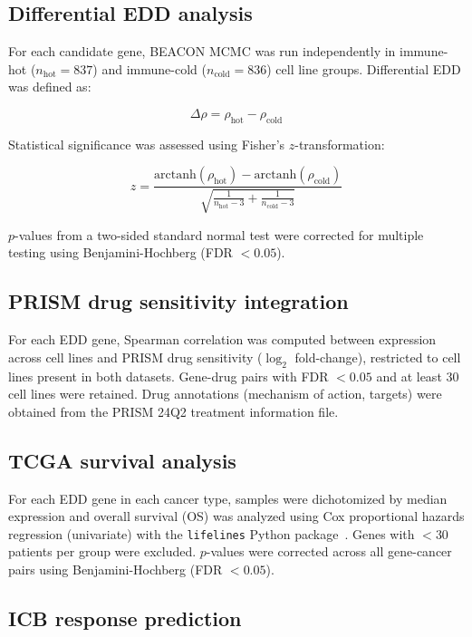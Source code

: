 \documentclass[12pt]{article}
\begin{document}
\subsection*{Differential EDD analysis}

For each candidate gene, BEACON MCMC was run independently in immune-hot ($n_\text{hot} = 837$) and immune-cold ($n_\text{cold} = 836$) cell line groups. Differential EDD was defined as:

\begin{equation}
\Delta\rho = \rho_\text{hot} - \rho_\text{cold}
\end{equation}

Statistical significance was assessed using Fisher's $z$-transformation:

\begin{equation}
z = \frac{\text{arctanh}(\rho_\text{hot}) - \text{arctanh}(\rho_\text{cold})}{\sqrt{\frac{1}{n_\text{hot}-3} + \frac{1}{n_\text{cold}-3}}}
\end{equation}

$p$-values from a two-sided standard normal test were corrected for multiple testing using Benjamini-Hochberg (FDR $< 0.05$).

\subsection*{PRISM drug sensitivity integration}

For each EDD gene, Spearman correlation was computed between expression across cell lines and PRISM drug sensitivity ($\log_2$ fold-change), restricted to cell lines present in both datasets. Gene-drug pairs with FDR $< 0.05$ and at least 30 cell lines were retained. Drug annotations (mechanism of action, targets) were obtained from the PRISM 24Q2 treatment information file.

\subsection*{TCGA survival analysis}

For each EDD gene in each cancer type, samples were dichotomized by median expression and overall survival (OS) was analyzed using Cox proportional hazards regression (univariate) with the \texttt{lifelines} Python package~\citep{Davidson-Pilon2019}. Genes with $< 30$ patients per group were excluded. $p$-values were corrected across all gene-cancer pairs using Benjamini-Hochberg (FDR $< 0.05$).

\subsection*{ICB response prediction}
\end{document}
